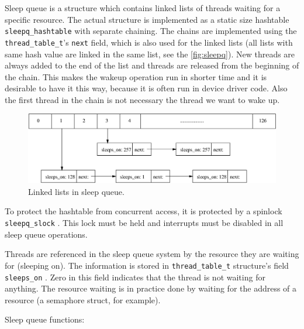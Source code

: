 \documentclass[twoside,a4paper]{report}
\newlength{\tablewidth}
\begin{document}
Sleep queue is a structure which contains linked lists of threads
waiting for a specific resource. The actual structure is implemented
as a static size hashtable \texttt{sleepq\_hashtable}
 with separate
chaining. The chains are implemented using the
\texttt{thread\_table\_t}'s \texttt{next} field, which is also used
for the linked lists (all lists with same hash value are linked in the
same list, see the \autoref{fig:sleepq}). New threads are always added
to the end of the list and threads are released from the beginning of
the chain. This makes the wakeup operation run in shorter time and it
is desirable to have it this way, because it is often run in device
driver code. Also the first thread in the chain is not necessary the
thread we want to wake up.

\begin{figure}
\begin{center}
\includegraphics[width=\tablewidth,angle=0]{pics/sleepq.eps}
\caption{Linked lists in sleep queue.}
\label{fig:sleepq}
\end{center}
\end{figure}


To protect the hashtable from concurrent access, it is protected by a
spinlock \texttt{sleepq\_slock}
. This lock must be held
and interrupts must be disabled in all sleep queue operations.

Threads are referenced in the sleep queue system by the resource they
are waiting for (sleeping on). The information is stored in
\texttt{thread\_table\_t} structure's field \texttt{sleeps\_on}
. Zero in this field indicates
that the thread is not waiting for anything. The resource waiting is
in practice done by waiting for the address of a resource (a semaphore
struct, for example).

Sleep queue functions:
\end{document}
